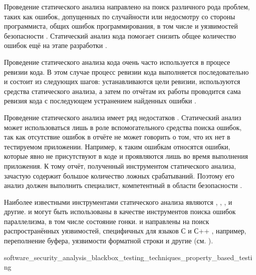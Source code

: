 %
Проведение статического анализа направлено на поиск различного рода проблем, таких как ошибок, 
допущенных по случайности или недосмотру со стороны программиста, общих ошибок программирования, 
в том числе и уязвимостей безопасности . 
%
Статический анализ кода помогает снизить общее количество ошибок ещё на этапе разработки 
.

%
Проведение статического анализа кода очень часто используется в процесе ревизии кода. 
%
В этом случае процесс ревизии кода выполняется последовательно и состоит из следующих шагов: 
устанавливаются цели ревизии, используются средства статического анализа, а затем по отчётам их 
работы проводится сама ревизия кода с последующем устранением найденных ошибки 
. 

%
Проведение статического анализа имеет ряд недостатков  
. 
%
Статический анализ может использоваться лишь в роле вспомогательного средства поиска ошибок, 
так как отсутствие ошибок в отчёте не может говорить о том, что их нет в тестируемом приложении. 
%
Например, к таким ошибкам относятся ошибки, которые явно не присутствуют в коде и проявляются лишь 
во время выполнения приложения. 
%
К тому отчёт, полученный инструментом статического анализа, зачастую содержит большое количество 
ложных срабатываний. 
%
Поэтому его анализ должен выполнить специалист, компетентный в области безопасности 
.

%
Наиболее известными инструментами статического анализа являются  , 
 ,  ,   
и другие. 
%
 и  могут быть использованы в качестве инструментов поиска ошибок 
параллелизма, в том числе состояние гонки. 
%
 и  направлены на поиск распространённых уязвимостей, специфичных для языков 
С  и С++ , например, переполнение буфера, 
уязвимости форматной строки и другие (см. 
).


	{software_security_analysis_blackbox_testing_techniques_property_based_testing}

